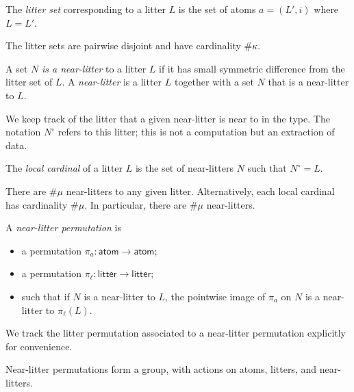 \documentclass{article}
\begin{document}
\begin{definition}
    The \emph{litter set} corresponding to a litter \( L \) is the set of atoms \( a = (L', i) \) where \( L = L' \).
\end{definition}
\begin{lemma}
    The litter sets are pairwise disjoint and have cardinality \( \#\kappa \).
\end{lemma}
\begin{definition}
    A set \( N \) \emph{is a near-litter} to a litter \( L \) if it has small symmetric difference from the litter set of \( L \).
    A \emph{near-litter} is a litter \( L \) together with a set \( N \) that is a near-litter to \( L \).
\end{definition}
\begin{remark}
    We keep track of the litter that a given near-litter is near to in the type.
    The notation \( N^\circ \) refers to this litter; this is not a computation but an extraction of data.
\end{remark}
\begin{definition}
    The \emph{local cardinal} of a litter \( L \) is the set of near-litters \( N \) such that \( N^\circ = L \).
\end{definition}
\begin{lemma}
    There are \( \#\mu \) near-litters to any given litter.
    Alternatively, each local cardinal has cardinality \( \#\mu \).
    In particular, there are \( \#\mu \) near-litters.
\end{lemma}
\begin{definition}
    A \emph{near-litter permutation} is
    \begin{itemize}
        \item a permutation \( \pi_a \colon \mathsf{atom} \to \mathsf{atom} \);
        \item a permutation \( \pi_\ell \colon \mathsf{litter} \to \mathsf{litter} \);
        \item such that if \( N \) is a near-litter to \( L \), the pointwise image of \( \pi_a \) on \( N \) is a near-litter to \( \pi_\ell(L) \).
    \end{itemize}
\end{definition}
\begin{remark}
    We track the litter permutation associated to a near-litter permutation explicitly for convenience.
\end{remark}
\begin{lemma}
    Near-litter permutations form a group, with actions on atoms, litters, and near-litters.
\end{lemma}
\end{document}
